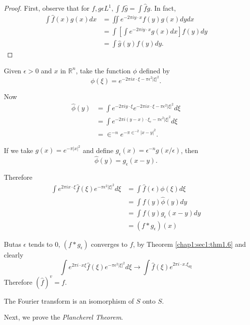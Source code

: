 \begin{proof}
  First, observe that for $f, g \epsilon  L^1, \int f \hat{g} = \int
  \hat{f} g$. In fact, 
  \begin{align*}
    \int \hat{f} (x) g (x) dx & = \iint e^{-2 \pi iy \cdot x} f(y)g(x) dy dx\\
    &= \int \left[\int e^{-2 \pi iy \cdot x} g(x) dx\right] f(y) dy\\
    &= \int \hat{g}(y) f(y) dy.
  \end{align*}
\end{proof}

Given $\epsilon > 0$ and $x$ in $\mathbb{R}^n$, take the function
$\phi$ defined by  
$$
\phi (\xi) = e^{-2 \pi ix\cdot \xi - \pi \epsilon^2 | \xi |^2}.
$$

Now 
\begin{align*}
\hat{\phi}(y) & = \int e^{-2 \pi i y \cdot \xi } e^{-2 \pi ix\cdot \xi - \pi
  \epsilon^2|\xi|^2}d \xi  \\ 
& = \int e^{-2 \pi i(y-x)\cdot \xi_e- \pi \epsilon^2 | \xi |^2} d \xi\\
& = \in^{-n}e^{-\pi \in^{-2} |x-y|^2}.
\end{align*}

If we take $g(x) = e^{-\pi |x|^2} $ and define $g_{\epsilon}(x) =
\epsilon^{-n} g(x/\epsilon)$, then  
$$
\hat{\phi}(y) = g_{\epsilon}(x-y).
$$

Therefore 
\begin{align*}
  \int e^{2 \pi i x\cdot \xi } \hat{f}(\xi) e^{-\pi \epsilon^2|\xi|^2} d \xi
  & = \int \hat{f}(\epsilon) \phi (\xi) d\xi\\
  & = \int f(y) \hat{\phi}(y) dy \\
  &= \int f(y) g_{\epsilon}(x-y) dy\\
  & = (f*g_{\epsilon }) (x) 
\end{align*}

But\pageoriginale as $\epsilon$ tends to 0, $(f*g_{\epsilon})$ converges to
$f$, by Theorem \ref{chap1:sec1:thm1.6} and clearly  
$$
\int e^{2 \pi i\cdot x \xi } \hat{f}(\xi) e^{-\pi
  \epsilon^2|\xi|^2} d \xi \to \int \hat{f}(\xi)e^{2 \pi i\cdot x
 .\xi_{d \xi } } 
$$
Therefore $(\hat{f})^v = f$.

\setcounter{coro}{16}
\begin{coro}\label{chap1:sec2:coro1.17}%
  The Fourier transform is an isomorphism of $S$ onto $S$.
\end{coro}

Next, we prove the \textit{ Plancherel Theorem}.

